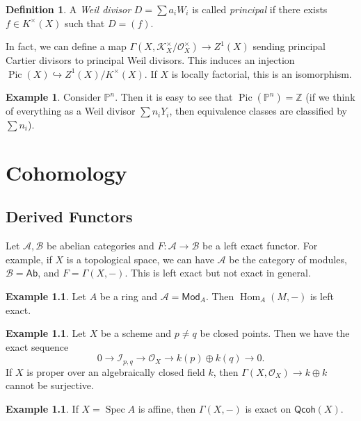 \documentclass[leqno, openany]{memoir}
\theoremstyle{definition}
\newtheorem{defn}[thm]{Definition}
\newtheorem{exm}[thm]{Example}
\theoremstyle{remark}
\theoremstyle{plain}
\theoremstyle{definition}
\theoremstyle{remark}
\newcommand{\Z}{\mathbb{Z}}
\renewcommand{\P}{\mathbb{P}}
\newcommand{\mc}[1]{\mathcal{#1}}
\newcommand{\ms}[1]{\mathsf{#1}}
\DeclareMathOperator{\Hom}{Hom}
\DeclareMathOperator{\Spec}{Spec}
\DeclareMathOperator{\Pic}{Pic}
\begin{document}
\begin{defn}
    A \textit{Weil divisor} $D = \sum a_i W_i$ is called \textit{principal} if there exists $f \in K^{\times}(X)$ such that $D = (f)$.
\end{defn}

In fact, we can define a map $\Gamma(X, \mc{K}_X^{\times} / \mc{O}_X^{\times}) \to Z^1(X)$ sending principal Cartier divisors to principal Weil divisors. This induces an injection $\Pic(X) \hookrightarrow Z^1(X)/K^{\times}(X)$. If $X$ is locally factorial, this is an isomorphism.

\begin{exm}
    Consider $\P^n$. Then it is easy to see that $\Pic(\P^n) = \Z$ (if we think of everything as a Weil divisor $\sum n_i Y_i$, then equivalence classes are classified by $\sum n_i$).
\end{exm}

\chapter{Cohomology}%
\label{cha:cohomology}

\section{Derived Functors}%
\label{sec:derived_functors}

Let $\mc{A}, \mc{B}$ be abelian categories and $F \colon \mc{A} \to \mc{B}$ be a left exact functor. For example, if $X$ is a topological space, we can have $\mc{A}$ be the category of modules, $\mc{B} = \ms{Ab}$, and $F = \Gamma(X,-)$. This is left exact but not exact in general.

\begin{exm}
    Let $A$ be a ring and $\mc{A} = \ms{Mod}_A$. Then $\Hom_A(M,-)$ is left exact.
\end{exm}

\begin{exm}
    Let $X$ be a scheme and $p \neq q$ be closed points. Then we have the exact sequence
    \[ 0 \to \mc{I}_{p,q} \to \mc{O}_X \to k(p) \oplus k(q) \to 0. \]
    If $X$ is proper over an algebraically closed field $k$, then $\Gamma(X, \mc{O}_X) \to k \oplus k$ cannot be surjective.
\end{exm}

\begin{exm}
    If $X = \Spec A$ is affine, then $\Gamma(X, -)$ is exact on $\ms{Qcoh}(X)$.
\end{exm}
\end{document}
